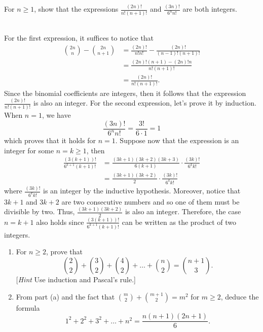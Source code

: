 \begin{exercise}
    For $n \geq 1$, show that the expressions $\displaystyle \frac{(2n)!}{n!(n+1)!}$ and $\displaystyle \frac{(3n)!}{6^n n!}$ are both integers. \\
\end{exercise}

\begin{solution}
    \\ For the first expression, it suffices to notice that
    \begin{align*}
        \binom{2n }{n } - \binom{2n }{n+1} &= \frac{(2n)!}{n!n!} - \frac{(2n)!}{(n-1)! (n+1)!} \\
        &= \frac{(2n)!(n+1) - (2n)!n}{n!(n+1)!} \\
        &= \frac{(2n)!}{n!(n+1)!}.
    \end{align*}
    Since the binomial coefficients are integers, then it follows that the expression $\frac{(2n)!}{n!(n+1)!}$ is also an integer. For the second expression, let's prove it by induction. When $n = 1$, we have
    $$\frac{(3n)!}{6^n n!} = \frac{3!}{6 \cdot 1} = 1$$
    which proves that it holds for $n = 1$. Suppose now that the expression is an integer for some $n = k \geq 1$, then 
    \begin{align*}
        \frac{(3(k+1))!}{6^{k+1}(k+1)!} &= \frac{(3k+1)(3k+2)(3k+3)}{6(k+1)} \cdot \frac{(3k)!}{6^k k!} \\
        &= \frac{(3k+1)(3k+2)}{2} \cdot \frac{(3k)!}{6^k k!} 
    \end{align*}
    where $\frac{(3k)!}{6^k k!} $ is an integer by the inductive hypothesis. Moreover, notice that $3k+1$ and $3k+2$ are two consecutive numbers and so one of them must be divisible by two. Thus, $\frac{(3k+1)(3k+2)}{2}$ is also an integer. Therefore, the case $n = k+1$ also holds since $\frac{(3(k+1))!}{6^{k+1}(k+1)!}$ can be written as the product of two integers. \\
\end{solution}

\begin{exercise}
    \begin{enumerate}
        \item For $n \geq 2$, prove that
        $$\binom{2 }{2 } + \binom{3}{2} + \binom{4}{2} + \dots + \binom{n }{2} = \binom{n+1}{3}.$$
        [\textit{Hint} Use induction and Pascal's rule.]
        \item From part (a) and the fact that $\displaystyle \binom{ m }{2} + \binom{m+1 }{2} = m^2$ for $m \geq 2$, deduce the formula
        $$1^2 + 2^2 + 3^2 + \dots + n^2 = \frac{n(n+1)(2n+1)}{6}.$$
    \end{enumerate}
\end{exercise}

